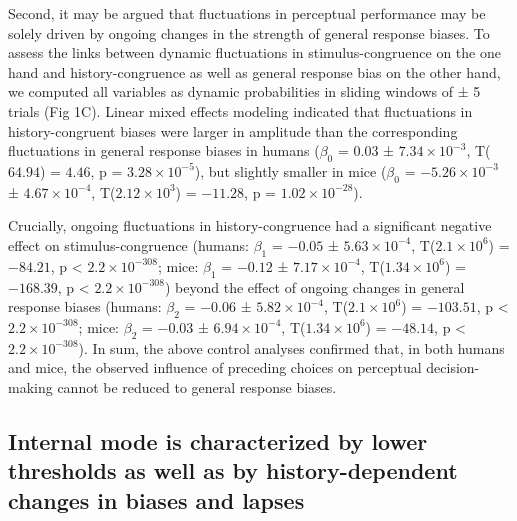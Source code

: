 \documentclass[
]{article}
\begin{document}
Second, it may be argued that fluctuations in perceptual performance may
be solely driven by ongoing changes in the strength of general response
biases. To assess the links between dynamic fluctuations in
stimulus-congruence on the one hand and history-congruence as well as
general response bias on the other hand, we computed all variables as
dynamic probabilities in sliding windows of ± 5 trials (Fig 1C).
Linear mixed effects modeling indicated that fluctuations in
history-congruent biases were larger in amplitude than the corresponding
fluctuations in general response biases in humans (\(\beta_0\) =
\(0.03\) ± \(\ensuremath{7.34\times 10^{-3}}\), T(\(64.94\)) = \(4.46\),
p = \(\ensuremath{3.28\times 10^{-5}}\)), but slightly smaller in mice
(\(\beta_0\) = \(\ensuremath{-5.26\times 10^{-3}}\) ±
\(\ensuremath{4.67\times 10^{-4}}\),
T(\(\ensuremath{2.12\times 10^{3}}\)) = \(-11.28\), p =
\(\ensuremath{1.02\times 10^{-28}}\)).

Crucially, ongoing fluctuations in history-congruence had a significant
negative effect on stimulus-congruence (humans: \(\beta_1\) = \(-0.05\)
± \(\ensuremath{5.63\times 10^{-4}}\),
T(\(\ensuremath{2.1\times 10^{6}}\)) = \(-84.21\), p < \(\ensuremath{2.2\times 10^{-308}}\); mice:
\(\beta_1\) = \(-0.12\) ± \(\ensuremath{7.17\times 10^{-4}}\),
T(\(\ensuremath{1.34\times 10^{6}}\)) = \(-168.39\), p < \(\ensuremath{2.2\times 10^{-308}}\)) beyond
the effect of ongoing changes in general response biases (humans:
\(\beta_2\) = \(-0.06\) ± \(\ensuremath{5.82\times 10^{-4}}\),
T(\(\ensuremath{2.1\times 10^{6}}\)) = \(-103.51\), p < \(\ensuremath{2.2\times 10^{-308}}\); mice:
\(\beta_2\) = \(-0.03\) ± \(\ensuremath{6.94\times 10^{-4}}\),
T(\(\ensuremath{1.34\times 10^{6}}\)) = \(-48.14\), p < \(\ensuremath{2.2\times 10^{-308}}\)). In sum,
the above control analyses confirmed that, in both humans and mice, the
observed influence of preceding choices on perceptual decision-making
cannot be reduced to general response biases.

\hypertarget{internal-mode-is-characterized-by-lower-thresholds-as-well-as-by-history-dependent-changes-in-biases-and-lapses}{%
\subsection{Internal mode is characterized by lower thresholds as well
as by history-dependent changes in biases and
lapses}\label{internal-mode-is-characterized-by-lower-thresholds-as-well-as-by-history-dependent-changes-in-biases-and-lapses}}
\end{document}
